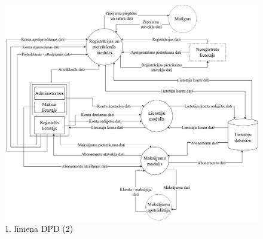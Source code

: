 \begin{figure}[htbp]
	\centering
	\includegraphics[width=\linewidth]{./src/img/1LīmeņaDPDLietotājuDatubāze.png}
	\caption{1. līmeņa DPD (2)}
	\label{fig:dpd-1.2}
\end{figure}
\eject


